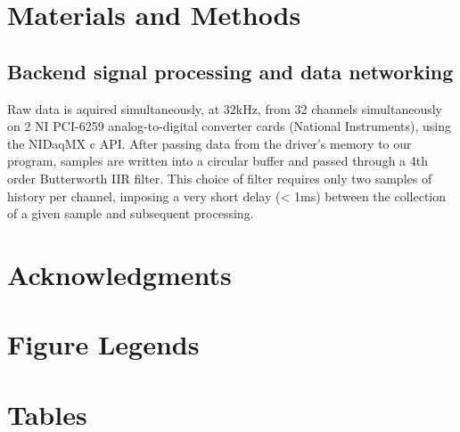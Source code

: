 \documentclass[10pt]{article}
\begin{document}
\section*{Materials and Methods}

\subsection*{Backend signal processing and data networking}
Raw data is aquired simultaneously, at 32kHz, from 32 channels simultaneously on 2 NI PCI-6259 analog-to-digital converter cards (National Instruments), using the NIDaqMX c API. After passing data from the driver's memory to our program, samples are written into a circular buffer and passed through a 4th order Butterworth IIR filter. This choice of filter requires only two samples of history per channel, imposing a very short delay (< 1ms) between the collection of a given sample and subsequent processing. 


\section*{Acknowledgments}




\section*{Figure Legends}


\section*{Tables}
\end{document}
